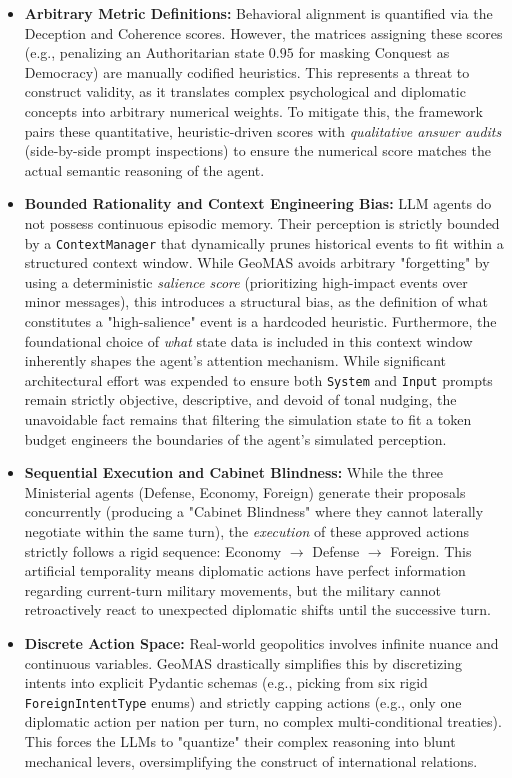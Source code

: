 \begin{itemize}
    \item \textbf{Arbitrary Metric Definitions:} Behavioral alignment is quantified via the Deception and Coherence scores. However, the matrices assigning these scores (e.g., penalizing an Authoritarian state $0.95$ for masking Conquest as Democracy) are manually codified heuristics. This represents a threat to construct validity, as it translates complex psychological and diplomatic concepts into arbitrary numerical weights. To mitigate this, the framework pairs these quantitative, heuristic-driven scores with \textit{qualitative answer audits} (side-by-side prompt inspections) to ensure the numerical score matches the actual semantic reasoning of the agent.
    \item \textbf{Bounded Rationality and Context Engineering Bias:} LLM agents do not possess continuous episodic memory. Their perception is strictly bounded by a \texttt{ContextManager} that dynamically prunes historical events to fit within a structured context window. While GeoMAS avoids arbitrary "forgetting" by using a deterministic \textit{salience score} (prioritizing high-impact events over minor messages), this introduces a structural bias, as the definition of what constitutes a "high-salience" event is a hardcoded heuristic. Furthermore, the foundational choice of \textit{what} state data is included in this context window inherently shapes the agent's attention mechanism. While significant architectural effort was expended to ensure both \texttt{System} and \texttt{Input} prompts remain strictly objective, descriptive, and devoid of tonal nudging, the unavoidable fact remains that filtering the simulation state to fit a token budget engineers the boundaries of the agent's simulated perception.
    \item \textbf{Sequential Execution and Cabinet Blindness:} While the three Ministerial agents (Defense, Economy, Foreign) generate their proposals concurrently (producing a "Cabinet Blindness" where they cannot laterally negotiate within the same turn), the \textit{execution} of these approved actions strictly follows a rigid sequence: Economy $\rightarrow$ Defense $\rightarrow$ Foreign. This artificial temporality means diplomatic actions have perfect information regarding current-turn military movements, but the military cannot retroactively react to unexpected diplomatic shifts until the successive turn.
    \item \textbf{Discrete Action Space:} Real-world geopolitics involves infinite nuance and continuous variables. GeoMAS drastically simplifies this by discretizing intents into explicit Pydantic schemas (e.g., picking from six rigid \texttt{ForeignIntentType} enums) and strictly capping actions (e.g., only one diplomatic action per nation per turn, no complex multi-conditional treaties). This forces the LLMs to "quantize" their complex reasoning into blunt mechanical levers, oversimplifying the construct of international relations.

\end{itemize}
